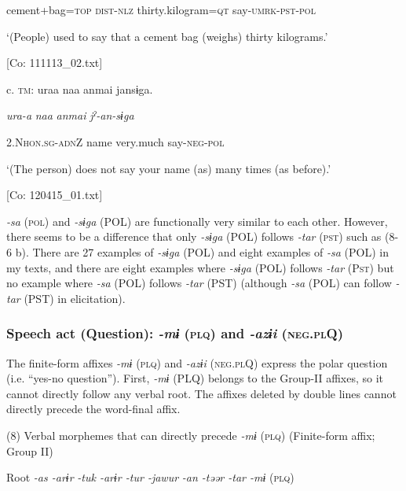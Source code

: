       cement+bag=\textsc{top}  \textsc{dist}-\textsc{nlz}  thirty.kilogram=\textsc{qt}  say-\textsc{umrk}-\textsc{pst}-\textsc{pol}

      ‘(People) used to say that a cement bag (weighs) thirty kilograms.’

      [Co: 111113\_02.txt]

  c.  \textsc{tm}:  uraa  naa  anmai  jansɨga.

      \textit{ura-a}  \textit{naa}  \textit{anmai}  \textit{jˀ-an-sɨga}

      2.N\textsc{hon}.\textsc{sg}-\textsc{adn}Z  name  very.much  say-\textsc{neg}-\textsc{pol}

      ‘(The person) does not say your name (as) many times (as before).’

      [Co: 120415\_01.txt]

\textit{{}-sa} (\textsc{pol}) and \textit{{}-sɨga} (POL) are functionally very similar to each other. However, there seems to be a difference that only \textit{{}-sɨga} (POL) follows \textit{{}-tar} (\textsc{pst}) such as (8-6 b). There are 27 examples of \textit{{}-sɨga} (POL) and eight examples of \textit{{}-sa} (POL) in my texts, and there are eight examples where \textit{{}-sɨga} (POL) follows \textit{{}-tar} (P\textsc{st}) but no example where \textit{{}-sa} (POL) follows \textit{-tar} (PST) (although \textit{-sa} (POL) can follow \textit{{}-tar} (PST) in elicitation).

\subsubsection{Speech act (Question): \textit{{}-mɨ} (\textsc{plq}) and \textit{{}-azɨi} (\textsc{neg}.\textsc{pl}Q)}

The finite-form affixes \textit{{}-mɨ} (\textsc{plq}) and \textit{{}-azɨi} (\textsc{neg}.\textsc{pl}Q) express the polar question (i.e. “yes-no question”).   First, \textit{{}-mɨ} (PLQ) belongs to the Group-II affixes, so it cannot directly follow any verbal root. The affixes deleted by double lines cannot directly precede the word-final affix.

(8)  Verbal morphemes that can directly precede \textit{-mɨ} (\textsc{plq}) (Finite-form affix; Group II)

  Root  \textit{{}-as  {}-arɨr} %
\textit{{}-tuk  {}-arɨr  {}-tur  {}-jawur} %
\textit{{}-an  {}-təər  {}-tar  {}-mɨ} (\textsc{plq})

